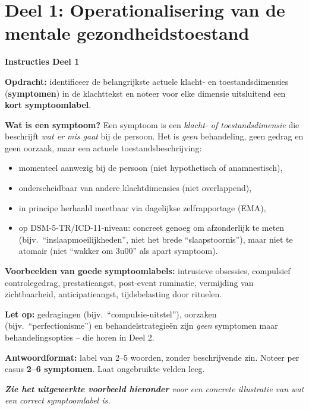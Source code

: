 \documentclass[11pt,a4paper]{article}
\begin{document}
\newpage


\section{Deel 1: Operationalisering van de mentale gezondheidstoestand}

\begin{tcolorbox}[colback=blue!3,colframe=PrimaryBlue,arc=2.5mm,boxrule=0.9pt,
  left=10pt,right=10pt,top=9pt,bottom=9pt]
\textbf{\color{PrimaryBlue}Instructies Deel 1}

\smallskip\small
\textbf{Opdracht:} identificeer de belangrijkste actuele klacht- en toestandsdimensies
(\textbf{symptomen}) in de klachttekst en noteer voor elke dimensie uitsluitend een
\textbf{kort symptoomlabel}.

\textbf{Wat is een symptoom?}
Een symptoom is een \emph{klacht- of toestandsdimensie} die beschrijft \emph{wat er
mis gaat} bij de persoon. Het is \emph{geen} behandeling, geen gedrag en geen oorzaak,
maar een actuele toestandsbeschrijving:
\begin{itemize}[topsep=2pt,itemsep=1pt]
\item momenteel aanwezig bij de persoon (niet hypothetisch of anamnestisch),
\item onderscheidbaar van andere klachtdimensies (niet overlappend),
\item in principe herhaald meetbaar via dagelijkse zelfrapportage (EMA),
\item op DSM-5-TR/ICD-11-niveau: concreet genoeg om afzonderlijk te meten (bijv.\ ``inslaapmoeilijkheden'', niet het brede ``slaapstoornis''), maar niet te atomair (niet ``wakker om 3u00'' als apart symptoom).
\end{itemize}

\textbf{Voorbeelden van goede symptoomlabels:}
intrusieve obsessies, compulsief controlegedrag, prestatieangst, post-event ruminatie,
vermijding van zichtbaarheid, anticipatieangst, tijdsbelasting door rituelen.

\textbf{Let op:} gedragingen (bijv.\ ``compulsie-uitstel''), oorzaken (bijv.\ ``perfectionisme'')
en behandelstrategieën zijn \emph{geen} symptomen maar behandelingsopties -- die horen in Deel 2.

\textbf{Antwoordformat:} label van 2--5 woorden, zonder beschrijvende zin.
Noteer per casus \textbf{2--6 symptomen}. Laat ongebruikte velden leeg.

\medskip
\textit{\textbf{Zie het uitgewerkte voorbeeld hieronder} voor een concrete illustratie van wat een correct symptoomlabel is.}
\end{tcolorbox}
\end{document}

